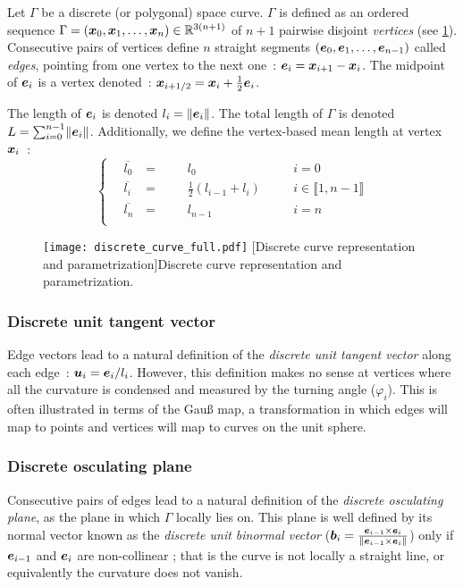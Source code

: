 Let $\Gamma$ be a discrete (or polygonal) space curve. $\Gamma$ is defined as an ordered sequence $\Gamma = (\boldsymbol{x}_0,  \boldsymbol{x}_1, \ldots, \boldsymbol{x}_n) \in \mathbb{R}^{3(n+1)}$ of $n+1$ pairwise disjoint \emph{vertices} (see \cref{fig:discrete_curve}). Consecutive pairs of vertices define $n$ straight segments $(\boldsymbol{e}_0,  \boldsymbol{e}_1, \ldots, \boldsymbol{e}_{n-1})$ called \emph{edges}, pointing from one vertex to the next one~: $\boldsymbol{e}_i = \boldsymbol{x}_{i+1} - \boldsymbol{x}_{i}$. The midpoint of $\boldsymbol{e}_i$ is a vertex denoted~: $\boldsymbol{x}_{i+1/2} = \boldsymbol{x}_{i} + \frac{1}{2}\boldsymbol{e}_{i}$.

The length of $\boldsymbol{e}_i$ is denoted $l_i = \lVert\boldsymbol{e}_i\rVert$. The total length of $\Gamma$ is denoted $L = \sum_{i=0}^{n-1} \lVert\boldsymbol{e}_i\rVert$. Additionally, we define the vertex-based mean length  at vertex $\boldsymbol{x}_i$~: 
\begin{equation}
	\left\{
	\begin{alignedat}{4}
		\,	&\overbar{l_0} 		& = &\,	&& l_0					&\quad 	&i = 0		\\
			&\overbar{l_i}		& = &	&& \frac{1}{2}(l_{i-1} + l_i)		&		&i \in \llbracket 1, n-1 \rrbracket	\\
			&\overbar{l_n} 	\,	& = &	&& l_{n-1} 				&		&i = n		\\
	\end{alignedat}
	\right.
\end{equation}

\begin{figure}[t]
	\centering
	\texttt{[image: discrete\_curve\_full.pdf]}
	[Discrete curve representation and parametrization]{Discrete curve representation and parametrization.}
	\label{fig:discrete_curve}
\end{figure}

\subsubsection{Discrete unit tangent vector}\label{sec:tangent_edge}
Edge vectors lead to a natural definition of the \emph{discrete unit tangent vector} along each edge~: $\boldsymbol{u}_i = \boldsymbol{e}_i / l_i$. However, this definition makes no sense at vertices where all the curvature is condensed and measured by the turning angle ($\varphi_i$). This is often illustrated in terms of the Gau{\ss} map, a transformation in which edges will map to points and vertices will map to curves on the unit sphere.

\subsubsection{Discrete osculating plane}
Consecutive pairs of edges lead to a natural definition of the \emph{discrete osculating plane}, as the plane in which $\Gamma$ locally lies on. This plane is well defined by its normal vector known as the \emph{discrete unit binormal vector} ($\boldsymbol{b}_i = \frac{\boldsymbol{e}_{i-1} \times \boldsymbol{e}_{i}}{\lVert\boldsymbol{e}_{i-1} \times \boldsymbol{e}_{i}\rVert}$) only if $\boldsymbol{e}_{i-1}$ and $\boldsymbol{e}_{i}$ are non-collinear ; that is the curve is not locally a straight line, or equivalently the curvature does not vanish.

